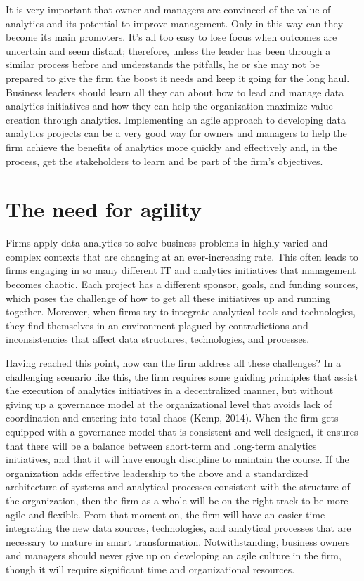 \documentclass[
  letterpaper,
  DIV=11,
  numbers=noendperiod]{scrreprt}
\begin{document}
It is very important that owner and managers are convinced of the value
of analytics and its potential to improve management. Only in this way
can they become its main promoters. It's all too easy to lose focus when
outcomes are uncertain and seem distant; therefore, unless the leader
has been through a similar process before and understands the pitfalls,
he or she may not be prepared to give the firm the boost it needs and
keep it going for the long haul. Business leaders should learn all they
can about how to lead and manage data analytics initiatives and how they
can help the organization maximize value creation through analytics.
Implementing an agile approach to developing data analytics projects can
be a very good way for owners and managers to help the firm achieve the
benefits of analytics more quickly and effectively and, in the process,
get the stakeholders to learn and be part of the firm's objectives.

\hypertarget{the-need-for-agility}{%
\section{The need for agility}\label{the-need-for-agility}}

Firms apply data analytics to solve business problems in highly varied
and complex contexts that are changing at an ever-increasing rate. This
often leads to firms engaging in so many different IT and analytics
initiatives that management becomes chaotic. Each project has a
different sponsor, goals, and funding sources, which poses the challenge
of how to get all these initiatives up and running together. Moreover,
when firms try to integrate analytical tools and technologies, they find
themselves in an environment plagued by contradictions and
inconsistencies that affect data structures, technologies, and
processes.

Having reached this point, how can the firm address all these
challenges? In a challenging scenario like this, the firm requires some
guiding principles that assist the execution of analytics initiatives in
a decentralized manner, but without giving up a governance model at the
organizational level that avoids lack of coordination and entering into
total chaos (Kemp, 2014). When the firm gets equipped with a governance
model that is consistent and well designed, it ensures that there will
be a balance between short-term and long-term analytics initiatives, and
that it will have enough discipline to maintain the course. If the
organization adds effective leadership to the above and a standardized
architecture of systems and analytical processes consistent with the
structure of the organization, then the firm as a whole will be on the
right track to be more agile and flexible. From that moment on, the firm
will have an easier time integrating the new data sources, technologies,
and analytical processes that are necessary to mature in smart
transformation. Notwithstanding, business owners and managers should
never give up on developing an agile culture in the firm, though it will
require significant time and organizational resources.
\end{document}
